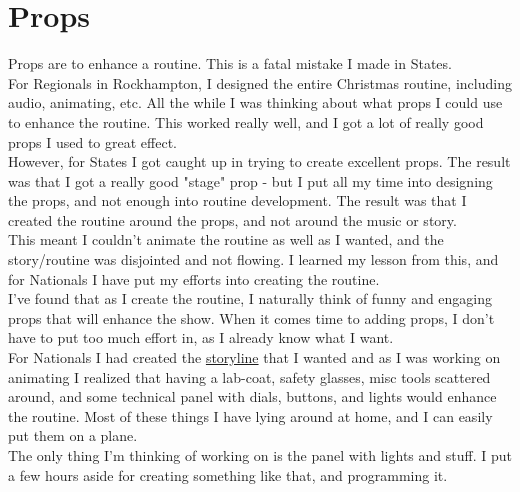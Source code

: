 	\chapter{Props}
    	\label{Props}
    	Props are to enhance a routine. This is a fatal mistake I made in States.\\
        
        For Regionals in Rockhampton, I designed the entire Christmas routine, including audio, animating, etc. All the while I was thinking about what props I could use to enhance the routine. This worked really well, and I got a lot of really good props I used to great effect.\\
        
        However, for States I got caught up in trying to create excellent props. The result was that I got a really good "stage" prop - but I put all my time into designing the props, and not enough into routine development. The result was that I created the routine around the props, and not around the music or story.\\
        
        This meant I couldn't animate the routine as well as I wanted, and the story/routine was disjointed and not flowing. I learned my lesson from this, and for Nationals I have put my efforts into creating the routine.\\
        
        I've found that as I create the routine, I naturally think of funny and engaging props that will enhance the show. When it comes time to adding props, I don't have to put too much effort in, as I already know what I want.\\
        
        For Nationals I had created the \hyperref[Story]{storyline} that I wanted and as I was working on animating I realized that having a lab-coat, safety glasses, misc tools scattered around, and some technical panel with dials, buttons, and lights would enhance the routine. Most of these things I have lying around at home, and I can easily put them on a plane.\\
        
        The only thing I'm thinking of working on is the panel with lights and stuff. I put a few hours aside for creating something like that, and programming it.\\
        
        